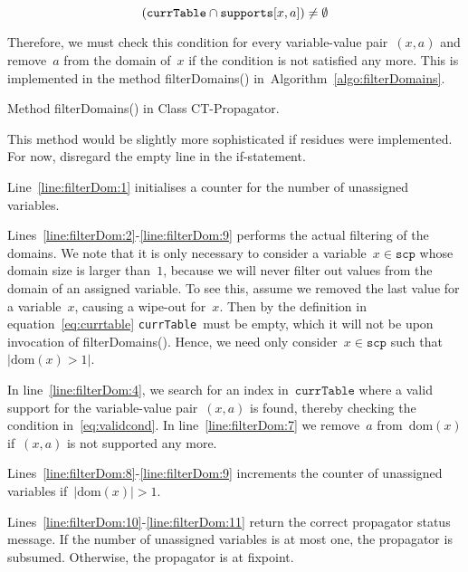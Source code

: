\documentclass[a4paper,11pt]{article}
\newcommand{\Todo}[1]{{\color{blue}#1}}
\newcommand{\Algoref}[1]{Algorithm~\ref{#1}}
\newcommand{\Lineref}[1]{Line~\ref{#1}}
\newcommand{\Linesref}[2]{Lines~\ref{#1}-\ref{#2}}
\newcommand{\Dom}[1]{\text{dom}({#1})}
\newcommand{\Scp}{\texttt{scp}}
\newcommand{\CurrTable}{\texttt{currTable}}
\newcommand{\Supports}{\texttt{supports}}
\numberwithin{equation}{section}
\begin{document}
\begin{enumerate}
  \begin{equation}
    \label{eq:validcond}
    (\CurrTable \Inter \Supports[x,a]) \neq \emptyset
  \end{equation}

  Therefore, we must check this condition for every variable-value pair~$(x,a)$ and
  remove~$a$ from the domain of~$x$ if the condition is not satisfied any more.
  This is implemented in the method filterDomains()
  in~\Algoref{algo:filterDomains}.%

  \begin{algorithm}[H]
    \begin{algorithmic}[1]  %
      
    \end{algorithmic}
    \caption{Method filterDomains() in Class CT-Propagator.}
    \label{algo:filterDomains}
  \end{algorithm}

  \Todo{This method would be slightly more sophisticated if residues
  were implemented. For now, disregard the empty line in the if-statement.}

  \Lineref{line:filterDom:1} initialises a counter for the number of unassigned
  variables.

  \Linesref{line:filterDom:2}{line:filterDom:9} performs the
  actual filtering of the domains. We note that it is only necessary to
  consider a variable~$x \in \Scp$ whose domain size is larger than~$1$,
  because we will never filter out values from the domain of an assigned
  variable. To see this, assume we removed the last value for a variable~$x$,
  causing a wipe-out for~$x$. Then by the definition in equation~\eqref{eq:currtable}
  \CurrTable~must be empty,
  which it will not be upon invocation of filterDomains(). Hence, we need
  only consider~$x \in \Scp$ such that~$|\Dom{x} > 1|$.

  In line~\ref{line:filterDom:4}, we search for an index in~$\CurrTable$
  where a valid support for the variable-value pair~$(x,a)$ is found, 
  thereby checking the condition in~\eqref{eq:validcond}.
  In line~\ref{line:filterDom:7} we remove~$a$ from~$\Dom{x}$ if~$(x,a)$
  is not supported any more.

  \Linesref{line:filterDom:8}{line:filterDom:9}
  increments the counter of unassigned variables if~$|\Dom{x}| > 1$.

  \Linesref{line:filterDom:10}{line:filterDom:11} return the correct
  propagator status message. If the number of unassigned variables is
  at most one, the propagator is subsumed. Otherwise, the propagator
  is at fixpoint.
  
\end{enumerate}
\end{document}
